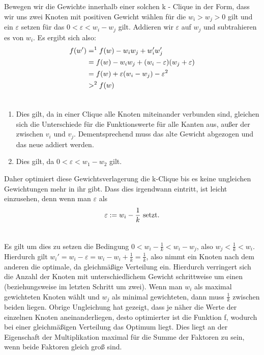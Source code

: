 \documentclass[12pt, a4paper]{article}
\begin{document}
Bewegen wir die Gewichte innerhalb einer solchen k - Clique in der Form, dass wir uns zwei Knoten mit positiven Gewicht wählen für die $w_i > w_j > 0$ gilt und ein $\varepsilon$ setzen für das $0 < \varepsilon < w_i - w_j$ gilt. Addieren wir $\varepsilon$ auf $w_j$ und subtrahieren es von $w_i$. Es ergibt sich also:
\begin{gather}
\begin{split}f(w') &=^1 f(w) - w_i w_j + w'_i w'_j \\
&= f(w) - w_i w_j + (w_i - \varepsilon)(w_j + \varepsilon) \\
&= f(w) + \varepsilon (w_i - w_j) - \varepsilon^2 \\
&>^2 f(w)\end{split}\notag\\\begin{split}\end{split}\notag
\end{gather}\begin{enumerate}
\item {}
Dies gilt, da in einer Clique alle Knoten miteinander verbunden sind, gleichen sich die Unterschiede für die Funktionswerte für alle Kanten aus, außer der zwischen $v_i$ und $v_j$. Dementsprechend muss das alte Gewicht abgezogen und das neue addiert werden.

\item {}
Dies gilt, da $0 < \varepsilon < w_1 - w_2$ gilt.

\end{enumerate}

Daher optimiert diese Gewichtsverlagerung die k-Clique bis es keine ungleichen Gewichtungen mehr in ihr gibt.
Dass dies irgendwann eintritt, ist leicht einzusehen, denn wenn man $\varepsilon$ als
\begin{gather}
\begin{split}\varepsilon := w_i - \frac{1}{k} \text{  setzt.}\end{split}\notag\\\begin{split}\end{split}\notag
\end{gather}

Es gilt um dies zu setzen die Bedingung $0 < w_i - \frac{1}{k} < w_i - w_j$, also $w_j < \frac{1}{k} < w_i$.
Hierdurch gilt $w_i' = w_i - \varepsilon = w_i - w_i + \frac{1}{k} = \frac{1}{k}$, also nimmt ein Knoten nach dem anderen die optimale, da gleichmäßige Verteilung ein. Hierdurch verringert sich die Anzahl der Knoten mit unterschiedlichem Gewicht schrittweise um einen (beziehungsweise im letzten Schritt um zwei). Wenn man $w_i$ als maximal gewichteten Knoten wählt und $w_j$ als minimal gewichteten, dann muss $\frac{1}{k}$ zwischen beiden liegen. Obrige Ungleichung hat gezeigt, dass je näher die Werte der einzelnen Knoten aneinanderliegen, desto optimierter ist die Funktion f, wodurch bei einer gleichmäßigen Verteilung das Optimum liegt. Dies liegt an der Eigenschaft der Multiplikation maximal für die Summe der Faktoren zu sein, wenn beide Faktoren gleich groß sind.
\end{document}
